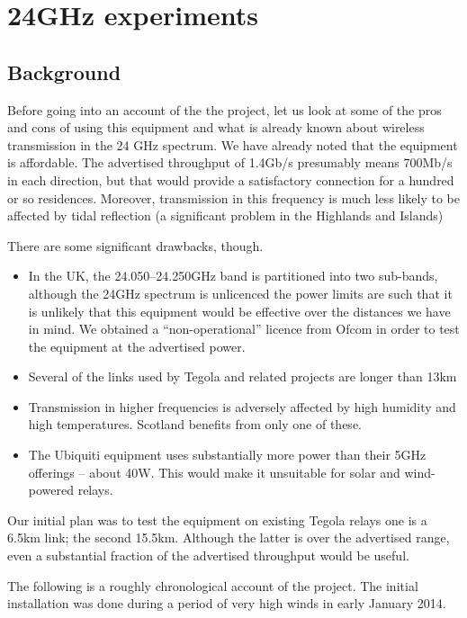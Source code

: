 \section{24GHz experiments}\label{ghz-experiments}

\subsection{Background}\label{background}

Before going into an account of the the project, let us look at some of
the pros and cons of using this equipment and what is already
known about wireless transmission in the 24 GHz spectrum. We have
already noted that the equipment is affordable. The advertised
throughput of 1.4Gb/s presumably means 700Mb/s in each direction, but
that would provide a satisfactory connection for a hundred or
so residences. Moreover, transmission in this frequency is much
less likely to be affected by tidal reflection (a significant problem
in the Highlands and Islands)

There are some significant drawbacks, though.

\begin{itemize}
\item
  In the UK, the 24.050--24.250GHz band is partitioned into two
  sub-bands, although the 24GHz spectrum is unlicenced the power 
  limits are such that it is unlikely that this equipment would be 
  effective over the distances we have in mind. We obtained a 
  ``non-operational'' licence from Ofcom in order to test the
  equipment  at the advertised power.
\item
  Several of the links used by Tegola and related projects are longer 
  than 13km
\item
  Transmission in higher frequencies is adversely affected by high 
  humidity and high temperatures. Scotland benefits from only one of 
  these.
\item
  The Ubiquiti equipment uses substantially more power than their 5GHz 
  offerings -- about 40W. This would make it unsuitable for solar and 
  wind-powered relays.
\end{itemize}

Our initial plan was to test the equipment on existing Tegola
relays one is a 6.5km link; the second 15.5km. Although the latter is
over the advertised range, even a substantial fraction of the
advertised throughput would be useful.

The following is a roughly chronological account of the project.
The initial installation was done during a period of very high winds
in early January 2014.

